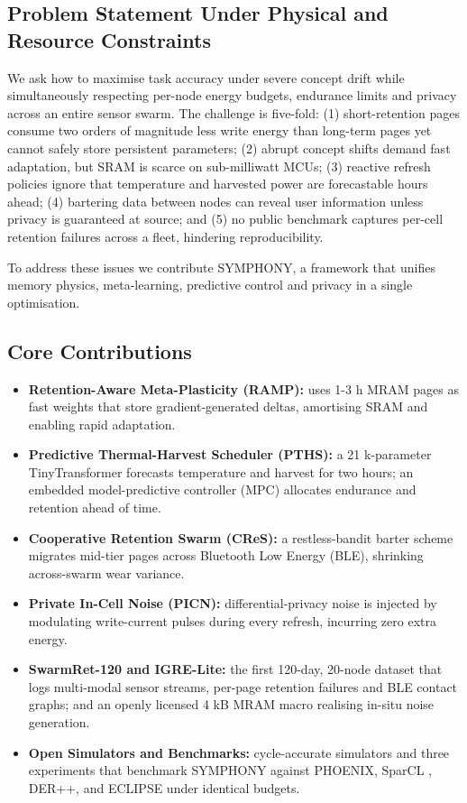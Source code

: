 \documentclass{article}
\begin{document}
\subsection{Problem Statement Under Physical and Resource Constraints}
We ask how to maximise task accuracy under severe concept drift while simultaneously respecting per-node energy budgets, endurance limits and privacy across an entire sensor swarm. The challenge is five-fold: (1) short-retention pages consume two orders of magnitude less write energy than long-term pages yet cannot safely store persistent parameters; (2) abrupt concept shifts demand fast adaptation, but SRAM is scarce on sub-milliwatt MCUs; (3) reactive refresh policies ignore that temperature and harvested power are forecastable hours ahead; (4) bartering data between nodes can reveal user information unless privacy is guaranteed at source; and (5) no public benchmark captures per-cell retention failures across a fleet, hindering reproducibility.

To address these issues we contribute SYMPHONY, a framework that unifies memory physics, meta-learning, predictive control and privacy in a single optimisation.

\subsection{Core Contributions}
\begin{itemize}
  \item \textbf{Retention-Aware Meta-Plasticity (RAMP):} uses 1-3 h MRAM pages as fast weights that store gradient-generated deltas, amortising SRAM and enabling rapid adaptation.
  \item \textbf{Predictive Thermal-Harvest Scheduler (PTHS):} a 21 k-parameter TinyTransformer forecasts temperature and harvest for two hours; an embedded model-predictive controller (MPC) allocates endurance and retention ahead of time.
  \item \textbf{Cooperative Retention Swarm (CReS):} a restless-bandit barter scheme migrates mid-tier pages across Bluetooth Low Energy (BLE), shrinking across-swarm wear variance.
  \item \textbf{Private In-Cell Noise (PICN):} differential-privacy noise is injected by modulating write-current pulses during every refresh, incurring zero extra energy.
  \item \textbf{SwarmRet-120 and IGRE-Lite:} the first 120-day, 20-node dataset that logs multi-modal sensor streams, per-page retention failures and BLE contact graphs; and an openly licensed 4 kB MRAM macro realising in-situ noise generation.
  \item \textbf{Open Simulators and Benchmarks:} cycle-accurate simulators and three experiments that benchmark SYMPHONY against PHOENIX, SparCL \cite{wang-2022-sparcl}, DER++, and ECLIPSE under identical budgets.
\end{itemize}
\end{document}
